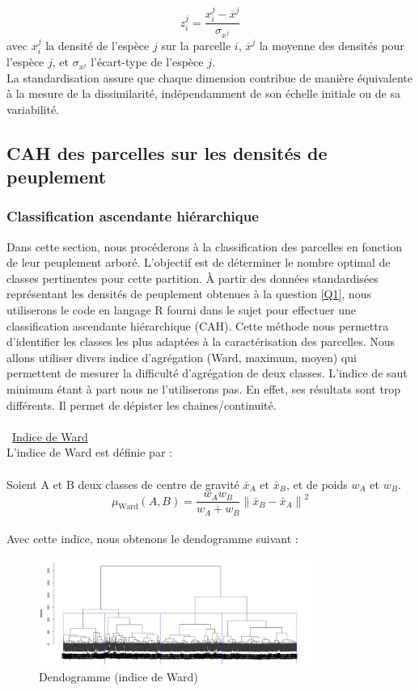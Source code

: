 \documentclass{article}
\begin{document}
\[
z_i^j = \frac{x_i^j - \overline{x}^j}{\sigma_{x^j}}
\]
avec \( x_i^j \) la densité de l’espèce \( j \) sur la parcelle \( i \), \( \overline{x}^j \) la moyenne des densités pour l’espèce \( j \), et \( \sigma_{x^j} \) l’écart-type de l’espèce \( j \).\\
La standardisation assure que chaque dimension contribue de manière équivalente à la mesure de la dissimilarité, indépendamment de son échelle initiale ou de sa variabilité.
\subsection{CAH des parcelles sur les densités de peuplement}
\subsubsection{Classification ascendante hiérarchique}
Dans cette section, nous procéderons à la classification des parcelles en fonction de leur peuplement arboré. L'objectif est de déterminer le nombre optimal de classes pertinentes pour cette partition. À partir des données standardisées représentant les densités de peuplement obtenues à la question \ref{Q1}, nous utiliserons le code en langage R fourni dans le sujet pour effectuer une classification ascendante hiérarchique (CAH). Cette méthode nous permettra d’identifier les classes les plus adaptées à la caractérisation des parcelles.
Nous allons utiliser divers indice d'agrégation (Ward, maximum, moyen) qui permettent de mesurer la difficulté d'agrégation de deux classes.
L'indice de saut minimum étant à part nous ne l'utiliserons pas. En effet, ses résultats sont trop différents. Il permet de dépister les chaines/continuité.
\\
\\
\textbullet\ \underline{Indice de Ward}
\\
L'indice de Ward est définie par :
\\
\\
Soient A et B deux classes de centre de gravité $\bar{x}_A$ et $\bar{x}_B$, et de poids $w_A$ et $w_B$.
\[
\mu_\text{Ward} (A,B) = \frac{w_A w_B}{w_A + w_B} \left\lVert \bar{x}_B - \bar{x}_A \right\lVert ^2
\]
\\
Avec cette indice, nous obtenons le dendogramme suivant :
\\
\begin{figure}[H]
    \centering
    \includegraphics[width=0.8\textwidth]{wardC.png}
    \caption{Dendogramme (indice de Ward)}
    \label{fig:Ward} 
\end{figure}
\end{document}
